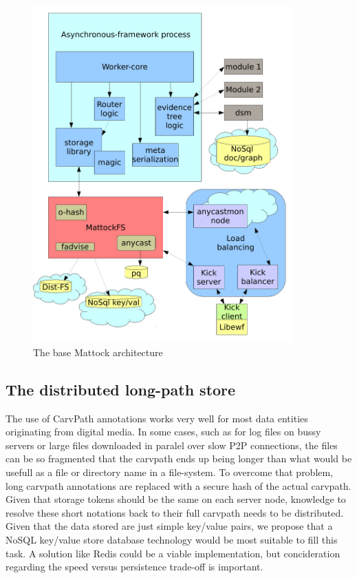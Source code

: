 \begin{figure}
\centering
\includegraphics[width=100mm]{mattock/libraryviewmattock.pdf}
\caption{The base Mattock architecture}
\label{fig:FlowInOut}
\end{figure}
\subsection{The distributed long-path store}
The use of CarvPath annotations works very well for most data entities originating from digital media. In some cases, such as for log files on bussy servers or large files downloaded in paralel over slow P2P connections, the files can be so fragmented that the carvpath ends up being longer than what would be usefull as a file or directory name in a file-system. To overcome that problem, long carvpath annotations are replaced with a secure hash of the actual carvpath. Given that storage tokens should be the same on each server node, knowledge to resolve these short notations back to their full carvpath needs to be distributed. Given that the data stored are just simple key/value pairs, we propose that a NoSQL key/value store database technology would be most suitable to fill this task. A solution like Redis could be a viable implementation, but concideration regarding the speed versus persistence trade-off is important.
